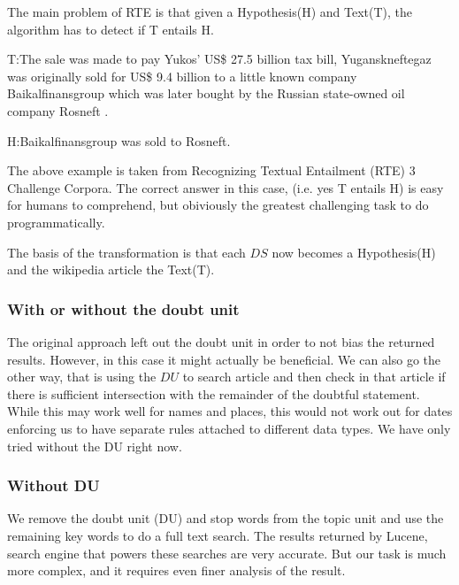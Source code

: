 \documentclass[11pt]{article}
\begin{document}
The main problem of RTE is that given a Hypothesis(H) and Text(T), the algorithm has to detect if T entails H.

T:The sale was made to pay Yukos' US\$ 27.5 billion tax bill, Yuganskneftegaz was originally sold for US\$ 9.4 billion to a little known company Baikalfinansgroup which was later bought by the Russian state-owned oil company Rosneft .

H:Baikalfinansgroup was sold to Rosneft.

The above example is taken from Recognizing Textual Entailment (RTE) 3 Challenge Corpora. The correct answer in this case, (i.e. yes T entails H) is easy for humans to comprehend, but obiviously the greatest challenging task to do programmatically.

The basis of the transformation is that each $DS$ now becomes a Hypothesis(H) and the wikipedia article the Text(T). 

\subsubsection{With or without the doubt unit}

The original approach left out the doubt unit in order to not bias the returned results. However, in this case it might actually be beneficial. We can also go the other way, that is using the $DU$ to search article and then check in that article if there is sufficient intersection with the remainder of the doubtful statement. While this may work well for names and places, this would not work out for dates enforcing us to have separate rules attached to different data types. We have only tried without the DU right now.

\subsubsection{Without DU}
We remove the doubt unit (DU) and stop words from the topic unit and use the remaining key words to do a full text search. The results returned by Lucene, search engine that powers these searches are very accurate. But our task is much more complex, and it requires even finer analysis of the result. 
\end{document}

